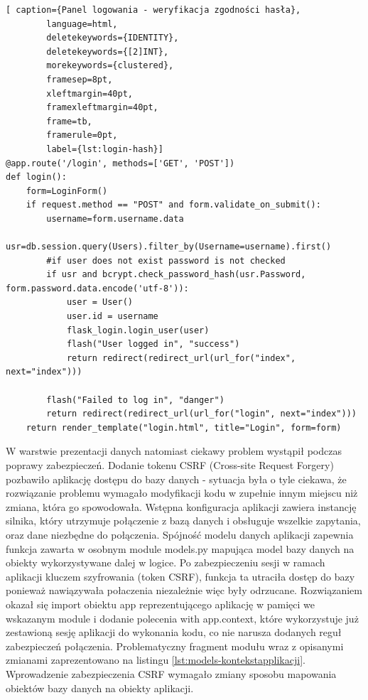 \documentclass[a4paper,10pt, twoside]{report}
\begin{document}
\begin{large}
\begin{minipage}{\textwidth}
    \begin{lstlisting}[ caption={Panel logowania - weryfikacja zgodności hasła},
        language=html,
        deletekeywords={IDENTITY},
        deletekeywords={[2]INT},
        morekeywords={clustered},
        framesep=8pt,
        xleftmargin=40pt,
        framexleftmargin=40pt,
        frame=tb,
        framerule=0pt,
        label={lst:login-hash}]
@app.route('/login', methods=['GET', 'POST'])
def login():
    form=LoginForm()
    if request.method == "POST" and form.validate_on_submit():
        username=form.username.data
        usr=db.session.query(Users).filter_by(Username=username).first()
        #if user does not exist password is not checked
        if usr and bcrypt.check_password_hash(usr.Password, form.password.data.encode('utf-8')):
            user = User()
            user.id = username
            flask_login.login_user(user)
            flash("User logged in", "success")
            return redirect(redirect_url(url_for("index", next="index")))

        flash("Failed to log in", "danger")
        return redirect(redirect_url(url_for("login", next="index")))
    return render_template("login.html", title="Login", form=form)\end{lstlisting}
\end{minipage}

\bigskip
{W warstwie prezentacji danych natomiast ciekawy problem wystąpił podczas 
poprawy zabezpieczeń. Dodanie tokenu CSRF (Cross-site Request Forgery) pozbawiło
 aplikację dostępu do bazy danych - sytuacja była o tyle ciekawa, że rozwiązanie 
 problemu wymagało modyfikacji kodu w zupełnie innym miejscu niż zmiana, która go 
spowodowała. Wstępna konfiguracja aplikacji zawiera instancję silnika, który 
utrzymuje połączenie z bazą danych i obsługuje wszelkie zapytania, oraz dane 
niezbędne do połączenia. Spójność modelu danych aplikacji zapewnia funkcja 
zawarta w osobnym module models.py mapująca model bazy danych na obiekty 
wykorzystywane dalej w logice. Po zabezpieczeniu sesji w ramach aplikacji 
kluczem szyfrowania (token CSRF), funkcja ta utraciła dostęp do bazy ponieważ 
nawiązywała połaczenia niezależnie więc były odrzucane. Rozwiązaniem okazał się 
import obiektu app reprezentującego aplikację w pamięci we wskazanym module i 
dodanie polecenia with app.context, które wykorzystuje już zestawioną sesję 
aplikacji do wykonania kodu, co nie narusza dodanych reguł zabezpieczeń 
połączenia. Problematyczny fragment modułu wraz z opisanymi zmianami 
zaprezentowano na listingu \ref{lst:models-kontekstapplikacji}. Wprowadzenie 
zabezpieczenia CSRF wymagało zmiany sposobu mapowania obiektów bazy danych na 
obiekty aplikacji.}


\end{large}
\end{document}
